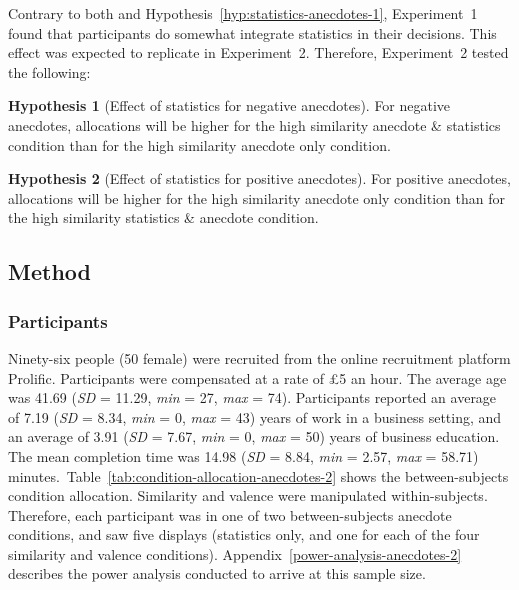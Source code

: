 \documentclass[a4paper, nobind, dvipsnames]{templates/ociamthesis}
\theoremstyle{definition}
\theoremstyle{definition}
\theoremstyle{definition}
\theoremstyle{definition}
\newtheorem{hypothesis}{Hypothesis}[chapter]
\theoremstyle{remark}
\begin{document}
Contrary to both \textcite{wainberg2013} and Hypothesis~\ref{hyp:statistics-anecdotes-1},
Experiment~1 found that participants do somewhat integrate statistics in their
decisions. This effect was expected to replicate in Experiment~2. Therefore,
Experiment~2 tested the following:

\begin{hypothesis}[Effect of statistics for negative anecdotes]
\protect\hypertarget{hyp:statistics-negative-anecdotes-2}{}{\label{hyp:statistics-negative-anecdotes-2} {} }For negative anecdotes, allocations will be higher for the high similarity
anecdote \& statistics condition than for the high similarity anecdote only
condition.
\end{hypothesis}

\begin{hypothesis}[Effect of statistics for positive anecdotes]
\protect\hypertarget{hyp:statistics-positive-anecdotes-2}{}{\label{hyp:statistics-positive-anecdotes-2} {} }For positive anecdotes, allocations will be higher for the high similarity
anecdote only condition than for the high similarity statistics \& anecdote
condition.
\end{hypothesis}

\subsection{Method}

\subsubsection{Participants}

Ninety-six people (50 female) were recruited from the online recruitment platform Prolific. Participants were compensated at a rate of £5 an hour. The average age was 41.69 (\emph{SD} = 11.29, \emph{min} = 27, \emph{max} = 74). Participants reported an average of 7.19 (\emph{SD} = 8.34, \emph{min} = 0, \emph{max} = 43) years of work in a business setting, and an average of 3.91 (\emph{SD} = 7.67, \emph{min} = 0, \emph{max} = 50) years of business education. The mean completion time was 14.98 (\emph{SD} = 8.84, \emph{min} = 2.57, \emph{max} = 58.71) minutes.~Table~\ref{tab:condition-allocation-anecdotes-2}
shows the between-subjects condition allocation. Similarity and valence were
manipulated within-subjects. Therefore, each participant was in one of two
between-subjects anecdote conditions, and saw five displays (statistics only,
and one for each of the four similarity and valence conditions).
Appendix~\ref{power-analysis-anecdotes-2} describes the power analysis
conducted to arrive at this sample size.
\end{document}
